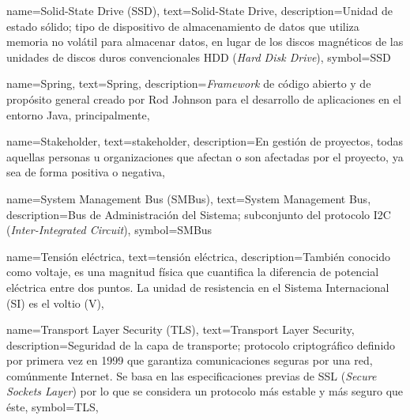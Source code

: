 {
    name={Solid-State Drive (SSD)},
    text={Solid-State Drive},
    description={Unidad de estado sólido; tipo de dispositivo de almacenamiento de datos que utiliza memoria no volátil para almacenar datos, en lugar de los discos magnéticos de las unidades de discos duros convencionales HDD (\textit{Hard Disk Drive})},
    symbol={SSD}
}

{
    name={Spring},
    text={Spring},
    description={\textit{Framework} de código abierto y de propósito general creado por Rod Johnson para el desarrollo de aplicaciones en el entorno Java, principalmente},
}

{
    name={Stakeholder},
    text={stakeholder},
    description={En gestión de proyectos, todas aquellas personas u organizaciones que afectan o son afectadas por el proyecto, ya sea de forma positiva o negativa},
}

{
    name={System Management Bus (SMBus)},
    text={System Management Bus},
    description={Bus de Administración del Sistema; subconjunto del protocolo I2C (\textit{Inter-Integrated Circuit})},
    symbol={SMBus}
}

{
    name={Tensión eléctrica},
    text={tensión eléctrica},
    description={También conocido como voltaje, es una magnitud física que cuantifica la diferencia de potencial eléctrica entre dos puntos.​ La unidad de resistencia en el Sistema Internacional (SI) es el voltio (V)},
}

{
    name={Transport Layer Security (TLS)},
    text={Transport Layer Security},
    description={Seguridad de la capa de transporte; protocolo criptográfico definido por primera vez en 1999 que garantiza comunicaciones seguras por una red, comúnmente Internet. Se basa en las especificaciones previas de SSL (\textit{Secure Sockets Layer}) por lo que se considera un protocolo más estable y más seguro que éste},
    symbol={TLS},
}

